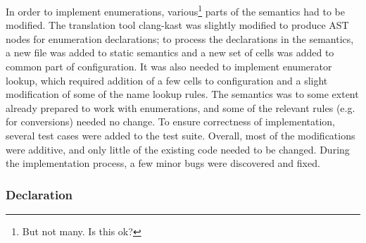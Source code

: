 \documentclass{fithesis3}
\begin{document}




In order to implement enumerations, various\footnote{But not many. Is this ok?} parts of the semantics had to be modified. The translation tool clang-kast was slightly modified to produce AST nodes for enumeration declarations; to process the declarations in the semantics, a new file was added to static semantics and a new set of cells was added to common part of configuration. It was also needed to implement enumerator lookup, which required addition of a few cells to configuration and a slight modification of some of the name lookup rules. The semantics was to some extent already prepared to work with enumerations, and some of the relevant rules (e.g. for conversions) needed no change. To ensure correctness of implementation, several test cases were added to the test suite. Overall, most of the modifications were additive, and only little of the existing code needed to be changed. During the implementation process, a few minor bugs were discovered and fixed. 


\subsubsection{Declaration}
\end{document}
